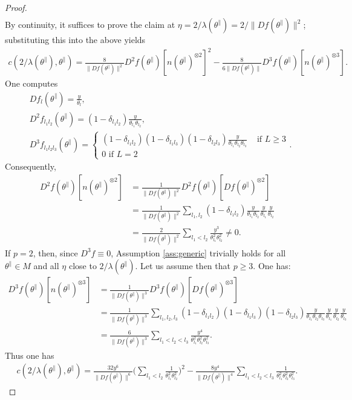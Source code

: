 \documentclass{article}
\newcommand{\tpa}{\theta^{\parallel}}
\theoremstyle{plain}
\theoremstyle{definition}
\theoremstyle{remark}
\begin{document}
\begin{proof}
\begin{align}
    \end{align}
    By continuity, it suffices to prove the claim at $\eta = 2/\lambda(\tpa) =2/\|Df(\tpa)\|^2$; substituting this into the above yields
    \begin{align}
        c(2/\lambda(\tpa),\tpa) = \frac{8}{\|Df(\tpa)\|^2}D^2f(\tpa)[n(\tpa)^{\otimes 2}]^2 - \frac{8}{6\|Df(\tpa)\|}D^3f(\tpa)[n(\tpa)^{\otimes 3}].
    \end{align}
    One computes
    \begin{align}
        &Df_l(\tpa) = \frac{y}{\theta_l}\label{eq:Df},\\&D^2f_{l_1l_2}(\tpa) = (1-\delta_{l_1l_2})\frac{y}{\theta_{l_1}\theta_{l_2}}\label{eq:D2f},\\&D^3f_{l_1l_2l_3}(\tpa) = \begin{cases} (1-\delta_{l_1l_2})(1-\delta_{l_1l_3})(1-\delta_{l_2l_3})\frac{y}{\theta_{l_1}\theta_{l_2}\theta_{l_3}}&\text{ if $L\geq 3$}\\ 0\text{ if $L=2$}\end{cases}.\label{eq:D3f}
    \end{align}
    Consequently,
    \begin{align}
        D^2f(\tpa)[n(\tpa)^{\otimes 2}] &= \frac{1}{\|Df(\tpa)\|^2}D^2f(\tpa)[Df(\tpa)^{\otimes 2}]\\&=\frac{1}{\|Df(\tpa)\|^2}\sum_{l_1,l_2}(1-\delta_{l_1l_2})\frac{y}{\theta_{l_1}\theta_{l_2}}\frac{y}{\theta_{l_1}}\frac{y}{\theta_{l_2}}\\&=\frac{2}{\|Df(\tpa)\|^2}\sum_{l_1<l_2}\frac{y^3}{\theta_{l_1}^2\theta_{l_2}^2}\neq 0.
    \end{align}
    If $p = 2$, then, since $D^3f\equiv 0$, Assumption \ref{ass:generic} trivially holds for all $\tpa\in M$ and all $\eta$ close to $2/\lambda(\tpa)$. Let us assume then that $p\geq 3$. One has:
    \begin{align}
        D^3f(\tpa)[n(\tpa)^{\otimes 3}] &= \frac{1}{\|Df(\tpa)\|^3}D^3f(\tpa)[Df(\tpa)^{\otimes 3}]\\&=\frac{1}{\|Df(\tpa)\|^3}\sum_{l_1,l_2,l_3}(1-\delta_{l_1l_2})(1-\delta_{l_1l_3})(1-\delta_{l_2l_3})\frac{y}{\theta_{l_1}\theta_{l_2}\theta_{l_3}}\frac{y}{\theta_{l_1}}\frac{y}{\theta_{l_2}}\frac{y}{\theta_{l_3}}\\&=\frac{6}{\|Df(\tpa)\|^3}\sum_{l_1<l_2<l_3}\frac{y^4}{\theta_{l_1}^2\theta_{l_2}^2\theta_{l_3}^2}.
    \end{align}
    Thus one has
    \begin{align}
        c(2/\lambda(\tpa),\tpa) = \frac{32y^6}{\|Df(\tpa)\|^6}\bigg(\sum_{l_1<l_2}\frac{1}{\theta_{l_1}^2\theta_{l_2}^2}\bigg)^2 - \frac{8y^4}{\|Df(\tpa)\|^4}\sum_{l_1<l_2<l_3}\frac{1}{\theta_{l_1}^2\theta_{l_2}^2\theta_{l_3}^2}.

\end{align}
\end{proof}
\end{document}
